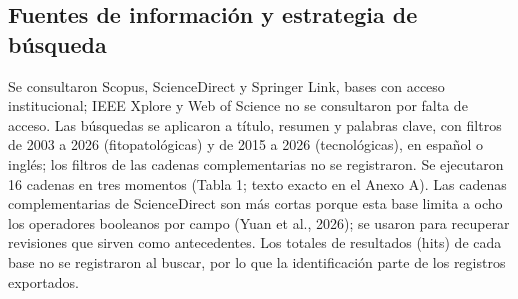 \documentclass[11pt]{article}
\begin{document}
\subsection{Fuentes de información y estrategia de búsqueda}

Se consultaron Scopus, ScienceDirect y Springer Link, bases con acceso institucional; IEEE Xplore y Web of Science no se consultaron por falta de acceso. Las búsquedas se aplicaron a título, resumen y palabras clave, con filtros de 2003 a 2026 (fitopatológicas) y de 2015 a 2026 (tecnológicas), en español o inglés; los filtros de las cadenas complementarias no se registraron. Se ejecutaron 16 cadenas en tres momentos (Tabla 1; texto exacto en el Anexo A). Las cadenas complementarias de ScienceDirect son más cortas porque esta base limita a ocho los operadores booleanos por campo (Yuan et al., 2026); se usaron para recuperar revisiones que sirven como antecedentes. Los totales de resultados (hits) de cada base no se registraron al buscar, por lo que la identificación parte de los registros exportados.
\end{document}
